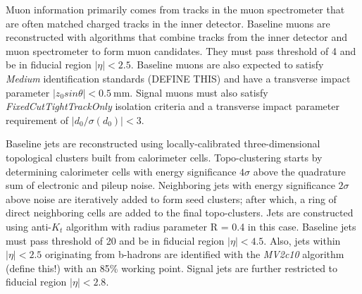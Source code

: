 Muon information primarily comes from tracks in the muon spectrometer that are often matched charged tracks in the inner detector.  Baseline muons are reconstructed with algorithms that combine tracks from the inner detector and muon spectrometer to form muon candidates.  They must pass \pt{} threshold of 4 \GeV and be in fiducial region $|\eta | < 2.5$. Baseline muons are also expected to satisfy \textit{Medium} identification standards (DEFINE THIS) and have a transverse impact parameter $|z_0sin\theta| < 0.5~\mathrm{mm}$.  Signal muons must also satisfy \textit{FixedCutTightTrackOnly} isolation criteria and a transverse impact parameter requirement of $|d_0/\sigma(d_0)| < 3$.

Baseline jets are reconstructed using locally-calibrated three-dimensional topological clusters built from calorimeter cells.  Topo-clustering starts by determining calorimeter cells with energy significance $4\sigma$ above the quadrature sum of electronic and pileup noise.  Neighboring jets with energy significance $2\sigma$ above noise are iteratively added to form seed clusters; after which, a ring of direct neighboring cells are added to the final topo-clusters.  Jets are constructed using anti-$K_t$ algorithm with radius parameter R = 0.4 in this case. Baseline jets must pass \pt{} threshold of 20 \GeV and be in fiducial region $|\eta | < 4.5$.  Also, jets within $|\eta | < 2.5$ originating from b-hadrons are identified with the \textit{MV2c10} algorithm (define this!) with an 85\% working point.  Signal jets are further restricted to fiducial region $|\eta | < 2.8$.



